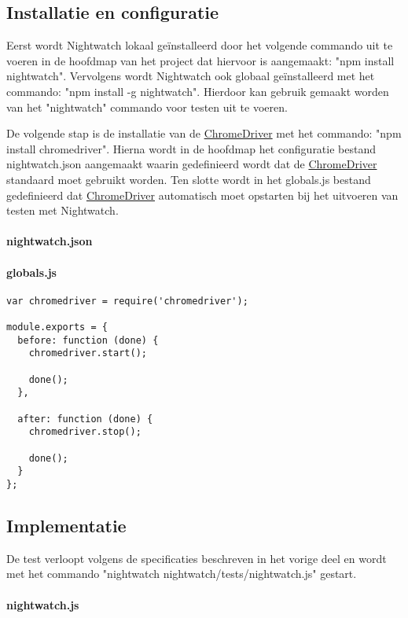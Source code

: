 \subsection{Installatie en configuratie}
Eerst wordt Nightwatch lokaal geïnstalleerd door het volgende commando uit te voeren in de hoofdmap van het project dat hiervoor is aangemaakt: "npm install nightwatch". Vervolgens wordt Nightwatch ook globaal geïnstalleerd met het commando: "npm install -g nightwatch". Hierdoor kan gebruik gemaakt worden van het "nightwatch" commando voor testen uit te voeren.

De volgende stap is de installatie van de \hyperref[chromedriver]{ChromeDriver} met het commando: "npm install chromedriver". Hierna wordt in de hoofdmap het configuratie bestand nightwatch.json aangemaakt waarin gedefinieerd wordt dat de \hyperref[chromedriver]{ChromeDriver} standaard moet gebruikt worden. Ten slotte wordt in het globals.js bestand gedefinieerd dat \hyperref[chromedriver]{ChromeDriver} automatisch moet opstarten bij het uitvoeren van testen met Nightwatch. 

\clearpage
\paragraph{nightwatch.json}


\paragraph{globals.js}
\begin{lstlisting}[breaklines=true]
var chromedriver = require('chromedriver');

module.exports = {
  before: function (done) {
    chromedriver.start();

    done();
  },

  after: function (done) {
    chromedriver.stop();

    done();
  }
};  
\end{lstlisting}

\clearpage
\subsection{Implementatie}
De test verloopt volgens de specificaties beschreven in het vorige deel en wordt met het commando "nightwatch nightwatch/tests/nightwatch.js" gestart.

\paragraph{nightwatch.js}
